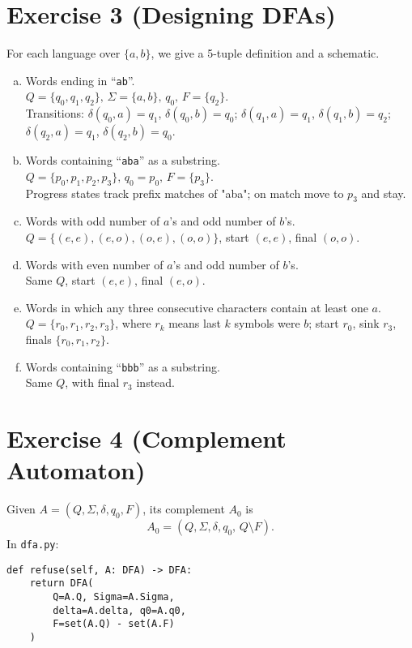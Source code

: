 \documentclass{article}
\begin{document}
\section*{Exercise 3 (Designing DFAs)}
For each language over $\{a,b\}$, we give a 5-tuple definition and a schematic.
\begin{enumerate}[a)]
  \item Words ending in ``\texttt{ab}''.\\
    $Q=\{q_0,q_1,q_2\},\,\Sigma=\{a,b\},\,q_0,\,F=\{q_2\}$.\\
    Transitions: $\delta(q_0,a)=q_1$, $\delta(q_0,b)=q_0$;
    $\delta(q_1,a)=q_1$, $\delta(q_1,b)=q_2$;
    $\delta(q_2,a)=q_1$, $\delta(q_2,b)=q_0$.
  \item Words containing ``\texttt{aba}'' as a substring.\\
    $Q=\{p_0,p_1,p_2,p_3\},\,q_0=p_0,\,F=\{p_3\}$.\\
    Progress states track prefix matches of "aba"; on match move to $p_3$ and stay.
  \item Words with odd number of $a$'s and odd number of $b$'s.\\
    $Q=\{(e,e),(e,o),(o,e),(o,o)\}$, start $(e,e)$, final $(o,o)$.
  \item Words with even number of $a$'s and odd number of $b$'s.\\
    Same $Q$, start $(e,e)$, final $(e,o)$.
  \item Words in which any three consecutive characters contain at least one $a$.\\
    $Q=\{r_0,r_1,r_2,r_3\}$, where $r_k$ means last $k$ symbols were $b$;
    start $r_0$, sink $r_3$, finals $\{r_0,r_1,r_2\}$.
  \item Words containing ``\texttt{bbb}'' as a substring.\\
    Same $Q$, with final $r_3$ instead.
\end{enumerate}

\section*{Exercise 4 (Complement Automaton)}
Given $A=(Q,\Sigma,\delta,q_0,F)$, its complement $A_0$ is
\[A_0 = (Q,\Sigma,\delta,q_0,\,Q\setminus F).\]
In \texttt{dfa.py}:
\begin{verbatim}
def refuse(self, A: DFA) -> DFA:
    return DFA(
        Q=A.Q, Sigma=A.Sigma,
        delta=A.delta, q0=A.q0,
        F=set(A.Q) - set(A.F)
    )
\end{verbatim}
\end{document}
